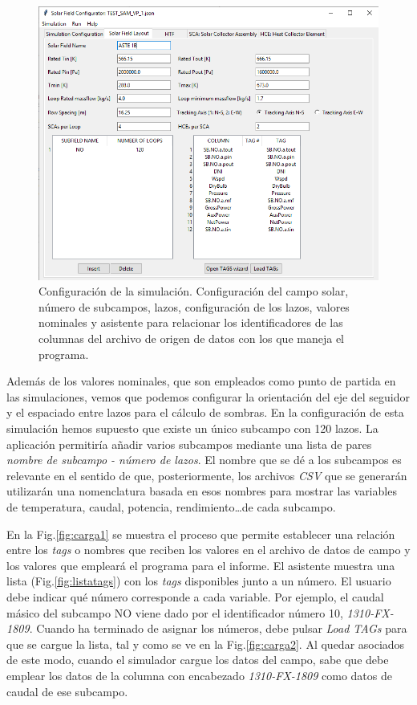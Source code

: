 \begin{figure}[H]
\includegraphics[width=0.9\linewidth]{images/interface02.png}
\caption[Configuración de la simulación del campo solar]{Configuración de la simulación. Configuración del campo solar, número de subcampos, lazos, configuración de los lazos, valores nominales y asistente para relacionar los identificadores de las columnas del archivo de origen de datos con los que maneja el programa.} 
\label{fig:interface02}
\end{figure}

Además de los valores nominales, que son empleados como punto de partida en las simulaciones, vemos que podemos configurar la orientación del eje del seguidor y el espaciado entre lazos para el cálculo de sombras. En la configuración de esta simulación hemos supuesto que existe un único subcampo con 120 lazos. La aplicación permitiría añadir varios subcampos mediante una lista de pares \emph{nombre de subcampo - número de lazos}. El nombre que se dé a los subcampos es relevante en el sentido de que, posteriormente, los archivos \emph{CSV} que se generarán  utilizarán una nomenclatura basada en esos nombres para mostrar las variables de temperatura, caudal, potencia, rendimiento\ldots de cada subcampo. 

En la Fig.\ref{fig:carga1} se muestra el proceso que permite establecer una relación entre los \emph{tags} o nombres que reciben los valores en el archivo de datos de campo y los valores que empleará el programa para el informe. El asistente muestra una lista (Fig.\ref{fig:listatags}) con los \emph{tags} disponibles junto a un número. El usuario debe indicar qué número corresponde a cada variable. Por ejemplo, el caudal másico del subcampo NO viene dado por el identificador número 10, \emph{1310-FX-1809}. Cuando ha terminado de asignar los números, debe pulsar \emph{Load TAGs} para que se cargue la lista, tal y como se ve en la Fig.\ref{fig:carga2}. Al quedar asociados de este modo, cuando el simulador cargue los datos del campo, sabe que debe emplear los datos de la columna con encabezado \emph{1310-FX-1809} como datos de caudal de ese subcampo.



